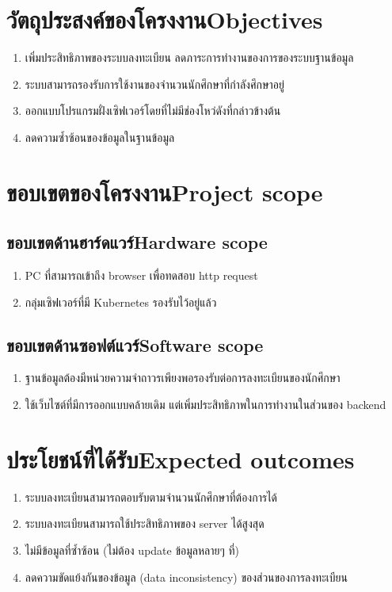\section{\ifcpe วัตถุประสงค์ของโครงงาน\else Objectives\fi}
\begin{enumerate}
    \item เพิ่มประสิทธิภาพของระบบลงทะเบียน ลดภาระการทำงานของการของระบบฐานข้อมูล
    \item ระบบสามารถรองรับการใช้งานของจำนวนนักศึกษาที่กำลังศึกษาอยู่
    \item ออกแบบโปรแกรมฝั่งเซิฟเวอร์โดยที่ไม่มีช่องโหว่ดังที่กล่าวข้างต้น
    \item ลดความซ้ำซ้อนของข้อมูลในฐานข้อมูล
\end{enumerate}

\section{\ifcpe ขอบเขตของโครงงาน\else Project scope\fi}

\subsection{\ifcpe ขอบเขตด้านฮาร์ดแวร์\else Hardware scope\fi}
\begin{enumerate}
    \item PC ที่สามารถเข้าถึง browser เพื่อทดสอบ http request
    \item กลุ่มเซิฟเวอร์ที่มี Kubernetes รองรับไว้อยู่แล้ว
\end{enumerate}
\subsection{\ifcpe ขอบเขตด้านซอฟต์แวร์\else Software scope\fi}
\begin{enumerate}
    \item ฐานข้อมูลต้องมีหน่วยความจำถาวรเพียงพอรองรับต่อการลงทะเบียนของนักศึกษา
    \item ใช้เว็บไซต์ที่มีการออกแบบคล้ายเดิม แต่เพิ่มประสิทธิภาพในการทำงานในส่วนของ backend
\end{enumerate}
\section{\ifcpe ประโยชน์ที่ได้รับ\else Expected outcomes\fi}
\begin{enumerate}
    \item ระบบลงทะเบียนสามารถตอบรับตามจำนวนนักศึกษาที่ต้องการได้
    \item ระบบลงทะเบียนสามารถใช้ประสิทธิภาพของ server ได้สูงสุด
    \item ไม่มีข้อมูลที่ซ้ำซ้อน (ไม่ต้อง update ข้อมูลหลายๆ ที่)
    \item ลดความขัดแย้งกันของข้อมูล (data inconsistency) ของส่วนของการลงทะเบียน
\end{enumerate}

